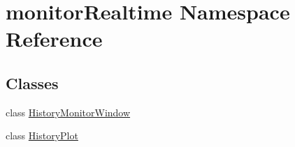\hypertarget{namespacemonitor_realtime}{}\section{monitor\+Realtime Namespace Reference}
\label{namespacemonitor_realtime}
\subsection*{Classes}
\begin{DoxyCompactItemize}
\item 
class \mbox{\hyperlink{classmonitor_realtime_1_1_history_monitor_window}{History\+Monitor\+Window}}
\item 
class \mbox{\hyperlink{classmonitor_realtime_1_1_history_plot}{History\+Plot}}
\end{DoxyCompactItemize}
